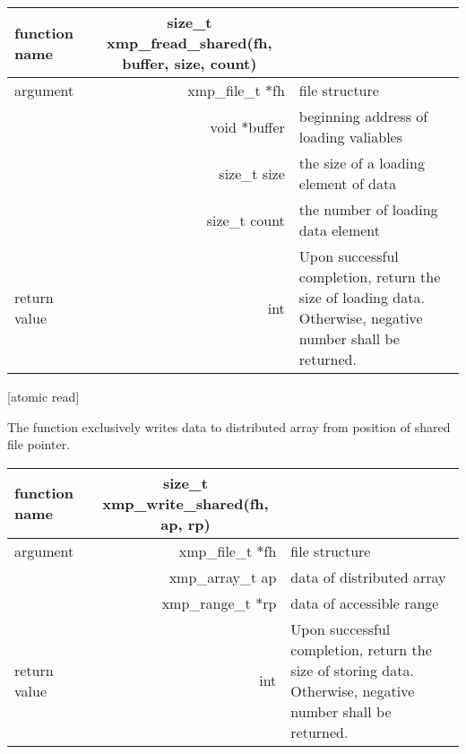    \begin{table}[h]
    \begin{center}
     \begin{tabular}{l|r|p{40mm}}
      \hline
      {\bf function name}  & \multicolumn{1}{c}{\bf size\_t
      xmp\_fread\_shared(fh, buffer, size, count)} &  \\ \hline
      argument & xmp\_file\_t $*$fh & file structure \\ \cline{2-3}
      & void $*$buffer & beginning address of loading valiables \\ \cline{2-3}
      & size\_t size & the size of a loading element of data \\ \cline{2-3}
      & size\_t count & the number of loading data element \\ \hline
      return value & int & Upon successful completion, return the size
	      of loading data. Otherwise, negative number shall be
	      returned. \\ \hline
      \end{tabular}
     \end{center}
    \label{tb:aaa}
   \end{table}


   [atomic read]

   The function exclusively writes data to distributed array from
   position of shared file pointer.

   \begin{table}[h]
    \begin{center}
     \begin{tabular}{l|r|p{70mm}}
      \hline
      {\bf function name}  & \multicolumn{1}{c}{\bf size\_t
      xmp\_write\_shared(fh, ap, rp)} &  \\ \hline
      argument & xmp\_file\_t $*$fh & file structure \\ \cline{2-3}
      & xmp\_array\_t ap & data of distributed array \\ \cline{2-3}
      & xmp\_range\_t $*$rp & data of accessible range \\ \hline
      return value & int & Upon successful completion, return the size
	      of storing data. Otherwise, negative number shall be
	      returned. \\ \hline
      \end{tabular}
     \end{center}
    \label{tb:aaa}
   \end{table}


